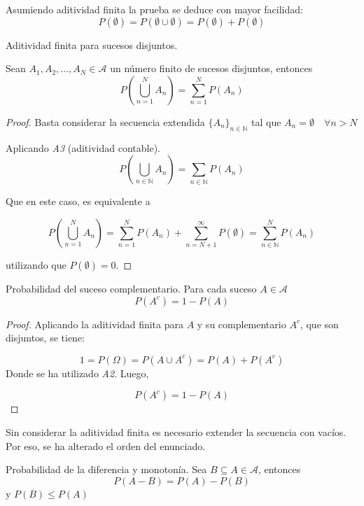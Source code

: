 \documentclass[
  a4paper,
  spanish,
  12pt,
]{scrartcl}
\begin{document}
\begin{nota}
Asumiendo aditividad finita la prueba se deduce con mayor facilidad:
$$
P(\emptyset) = P(\emptyset \cup \emptyset) = P(\emptyset)+ P(\emptyset) 
$$
\end{nota}

\begin{nprop}
Aditividad finita para sucesos disjuntos.

Sean $A_1, A_2, \dots, A_N \in \mathcal{A}$ un número finito de sucesos disjuntos, entonces
$$
P\left(\bigcup_{n=1}^N A_n \right) = \sum_{n=1}^N P(A_n)
$$
\end{nprop}

\begin{proof}

Basta considerar la secuencia extendida $\{A_n\}_{n \in \mathbb{N}}$ tal que 
$A_n = \emptyset \quad \forall n > N$ 

Aplicando \emph{A3} (aditividad contable).
$$
P\left(\bigcup_{n \in \mathbb{N}} A_n \right) = \sum_{n \in \mathbb{N}} P(A_n)
$$

Que en este caso, es equivalente a 

$$
P\left(\bigcup_{n=1}^N A_n\right) = \sum_{n=1}^N P(A_n) + \sum_{n=N+1}^\infty P(\emptyset) =  \sum_{n \in \mathbb{N}}^N P(A_n)
$$

utilizando que $P(\emptyset) = 0.$ 

\end{proof}

\begin{nprop}
 Probabilidad del suceso complementario. Para cada suceso $A \in \mathcal{A}$
$$
P(A^c) = 1 - P(A)
$$
\end{nprop}

\begin{proof}
Aplicando la aditividad finita para $A$ y su complementario $A^c$, que son disjuntos, se tiene:

$$
1 = P(\Omega) = P(A \cup A^c) = P(A) + P(A^c)
$$
Donde se ha utilizado \emph{A2}. Luego,

$$
P(A^c) = 1 - P(A)
$$

\end{proof}

\begin{nota}
Sin considerar la aditividad finita es necesario extender la secuencia con vacíos. Por eso, se ha alterado el orden del enunciado.
\end{nota}

\begin{nprop}
     Probabilidad de la diferencia y monotonía. Sea $B \subseteq A \in \mathcal{A}$, entonces
$$
P(A-B) = P(A)-P(B)
$$ 
y $P(B) \leq P(A)$
\end{nprop}
\end{document}
